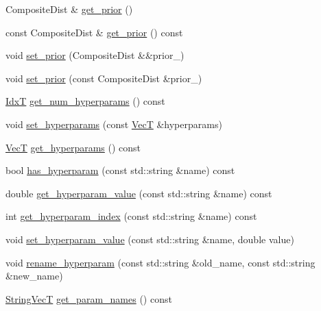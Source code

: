 \begin{DoxyCompactItemize}
\item 
Composite\+Dist \& \hyperlink{classmappel_1_1PointEmitterModel_a2182c250c15d590b582e76594e5f06b9}{get\+\_\+prior} ()
\item 
const Composite\+Dist \& \hyperlink{classmappel_1_1PointEmitterModel_a239826b8e6b914c0cdaa293f1f5ddfd4}{get\+\_\+prior} () const 
\item 
void \hyperlink{classmappel_1_1PointEmitterModel_a8ee7d3d5b4c1ae4500f802170a958ed7}{set\+\_\+prior} (Composite\+Dist \&\&prior\+\_\+)
\item 
void \hyperlink{classmappel_1_1PointEmitterModel_acf37c5f28dc0c66197162b3408a6b815}{set\+\_\+prior} (const Composite\+Dist \&prior\+\_\+)
\item 
\hyperlink{namespacemappel_ab17ec0f30b61ece292439d7ece81d3a8}{IdxT} \hyperlink{classmappel_1_1PointEmitterModel_a442522cdaaa76be15b00a4f25110d7ec}{get\+\_\+num\+\_\+hyperparams} () const 
\item 
void \hyperlink{classmappel_1_1PointEmitterModel_ac603a33d83a32f5e4dd826399521a28b}{set\+\_\+hyperparams} (const \hyperlink{namespacemappel_a2225ad69f358daa3f4f99282a35b9a3a}{VecT} \&hyperparams)
\item 
\hyperlink{namespacemappel_a2225ad69f358daa3f4f99282a35b9a3a}{VecT} \hyperlink{classmappel_1_1PointEmitterModel_a4085ade54f4b039c647bc9bf7804e007}{get\+\_\+hyperparams} () const 
\item 
bool \hyperlink{classmappel_1_1PointEmitterModel_afba2b17a81a506b0acd41616c8604412}{has\+\_\+hyperparam} (const std\+::string \&name) const 
\item 
double \hyperlink{classmappel_1_1PointEmitterModel_a3282cc59d5c6010a51f671ba72997705}{get\+\_\+hyperparam\+\_\+value} (const std\+::string \&name) const 
\item 
int \hyperlink{classmappel_1_1PointEmitterModel_ae13aa99689266d870b659d1045d595f1}{get\+\_\+hyperparam\+\_\+index} (const std\+::string \&name) const 
\item 
void \hyperlink{classmappel_1_1PointEmitterModel_ade3e56cc00c43e9b7a521d8c4778d3b7}{set\+\_\+hyperparam\+\_\+value} (const std\+::string \&name, double value)
\item 
void \hyperlink{classmappel_1_1PointEmitterModel_a447c83f0769e6dea2bfad68d957287d0}{rename\+\_\+hyperparam} (const std\+::string \&old\+\_\+name, const std\+::string \&new\+\_\+name)
\item 
\hyperlink{namespacemappel_aae88cf18bccfbb789a6019bcfbbfca68}{String\+VecT} \hyperlink{classmappel_1_1PointEmitterModel_aa910d1137d808041c0601f2dd3db96f0}{get\+\_\+param\+\_\+names} () const 

\end{DoxyCompactItemize}
